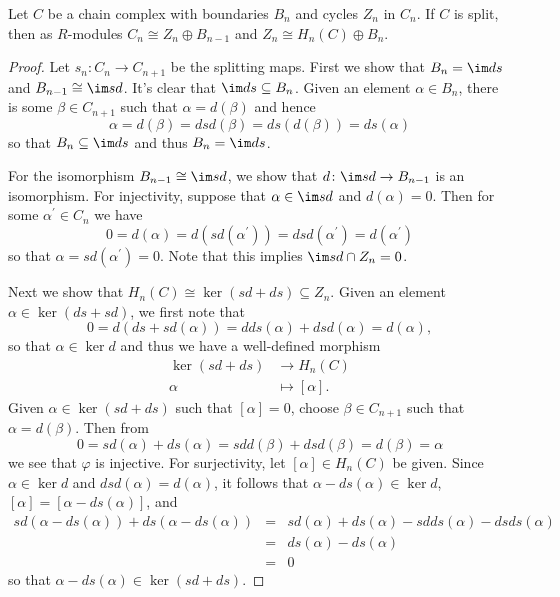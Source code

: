\documentclass[10pt]{amsart}
\begin{document}
\begin{lem}\label{lem5}
  Let $C$ be a chain complex with boundaries $B_n$ and cycles $Z_n$ in $C_n$.
  If $C$ is split, then as $R$-modules $C_n \cong Z_n \oplus B_{n-1}$ and $Z_n \cong H_n(C) \oplus B_n$.

  \begin{proof}
    Let $s_n : C_n \rightarrow C_{n+1}$ be the splitting maps.
    First we show that $B_n = \im ds$ and $B_{n-1} \cong \im sd$.
    It's clear that $\im ds \subseteq B_n$.
    Given an element $\alpha \in B_n$, there is some $\beta \in C_{n+1}$ such that $\alpha = d(\beta)$ and hence
    $$\alpha = d(\beta) = dsd(\beta) = ds(d(\beta))= ds(\alpha)$$
    so that $B_n \subseteq \im ds$ and thus $B_n = \im ds$.

    For the isomorphism $B_{n-1} \cong \im sd$, we show that $d \colon \im sd \rightarrow B_{n-1}$ is an isomorphism.
    For injectivity, suppose that $\alpha \in \im sd$ and $d(\alpha) = 0$.
    Then for some $\alpha^\prime \in C_n$ we have
    $$0 = d(\alpha) = d(sd(\alpha^\prime)) = dsd(\alpha^\prime) = d(\alpha^\prime)$$
    so that $\alpha = sd(\alpha^\prime) = 0$.
    Note that this implies $\im sd \cap Z_n = 0$.

    Next we show that $H_n(C) \cong \ker (sd + ds) \subseteq Z_n$.
    Given an element $\alpha \in \ker (ds + sd)$, we first note that
    $$0 = d(ds + sd(\alpha)) = dds(\alpha) + dsd(\alpha) = d(\alpha),$$
    so that $\alpha \in \ker d$ and thus we have a well-defined morphism
    \begin{align*}
      \ker (sd + ds) & \rightarrow H_n(C)\\
      \alpha &\mapsto [\alpha].
    \end{align*}
    Given $\alpha \in \ker (sd + ds)$ such that $[\alpha] = 0$, choose $\beta \in C_{n+1}$ such that $\alpha = d(\beta)$.
    Then from
    $$0 = sd(\alpha) + ds(\alpha) = sdd(\beta) + dsd(\beta) = d(\beta) = \alpha$$
    we see that $\varphi$ is injective.
    For surjectivity, let $[\alpha] \in H_n(C)$ be given.
    Since $\alpha \in \ker d$ and $dsd(\alpha) = d(\alpha)$, it follows that $\alpha - ds(\alpha) \in \ker d$, $[\alpha] = [\alpha - ds(\alpha)]$, and 
    \begin{eqnarray*}
      sd(\alpha - ds(\alpha)) + ds(\alpha - ds(\alpha)) &=& sd(\alpha) + ds(\alpha) - sdds(\alpha) - dsds(\alpha)\\
      &=& ds(\alpha) - ds(\alpha)\\
      &=& 0
    \end{eqnarray*}
    so that $\alpha - ds(\alpha) \in \ker (sd + ds)$.


\end{proof}
\end{lem}
\end{document}
